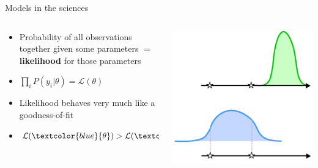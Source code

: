 \documentclass[10pt]{beamer}
\begin{document}
\begin{frame}{Models in the sciences}
  \begin{columns}
    \begin{column}{0.34\textwidth}
  \begin{itemize}
  \item Probability of all observations together given some parameters $=$ \textbf{likelihood} for those parameters
    \item $\prod_i P(y_i | \theta) = \mathcal{L}(\theta)$
    \item Likelihood behaves very much like a goodness-of-fit
      \item $\mathcal{L}(\textcolor{blue}{\theta}) > \mathcal{L}(\textcolor{green}{\theta})$
  \end{itemize}
    \end{column}
    \begin{column}{0.65\textwidth}
          \includegraphics[width=\textwidth]{camria-lik.png}
    \end{column}
        \end{columns}
\end{frame}
\end{document}
